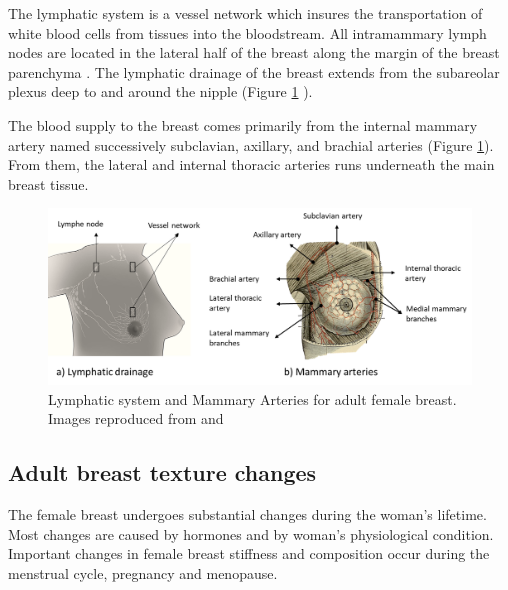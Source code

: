 The lymphatic system is a vessel network which insures the transportation of white blood cells from tissues into the bloodstream.  All intramammary lymph nodes are located in the lateral half of the breast along the margin of the breast parenchyma  \citep{kopans2007breast}.  The lymphatic drainage of the breast extends from the subareolar plexus deep to and around the nipple (Figure \ref{fig:lyphaticDrainageandArtery} ).

The blood supply to the breast comes primarily from the internal mammary artery named successively subclavian, axillary, and brachial arteries (Figure \ref{fig:lyphaticDrainageandArtery}). From them, the lateral and internal thoracic arteries runs underneath the main breast tissue.

	
\begin{figure}[!h]
\centering
\includegraphics[width=\textwidth,keepaspectratio]{figures/lyphaticDrainageandArtery.PNG} 
\caption[Lymphatic system and Mammary Arteries for adult female breast. ]{Lymphatic system and Mammary Arteries for adult female breast.  Images reproduced from \cite{NCI_2012} and \cite{pilcher_breast_1917}}
\label{fig:lyphaticDrainageandArtery}
\end{figure}





\subsection{Adult breast texture changes}\label{subsection:adultbreasttexturechanges}

The female breast undergoes substantial changes during the woman's lifetime.  Most changes are caused by hormones and by woman's physiological condition. Important changes in female breast stiffness and composition occur during the menstrual cycle, pregnancy and menopause. 

